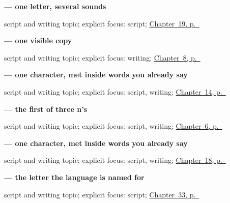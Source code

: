 \noindent\begin{minipage}[t]{\linewidth}
\raggedright
\textbf{ — one letter, several sounds}\par
\footnotesize script and writing topic; explicit focus: script; \hyperref[ch:ta-asking-age]{Chapter~19, p.~\pageref*{ch:ta-asking-age}}
\end{minipage}\par\smallskip

\noindent\begin{minipage}[t]{\linewidth}
\raggedright
\textbf{ — one visible copy}\par
\footnotesize script and writing topic; explicit focus: writing; \hyperref[ch:ta-please]{Chapter~8, p.~\pageref*{ch:ta-please}}
\end{minipage}\par\smallskip

\noindent\begin{minipage}[t]{\linewidth}
\raggedright
\textbf{ — one character, met inside words you already say}\par
\footnotesize script and writing topic; explicit focus: script, writing; \hyperref[ch:ta-seasons]{Chapter~14, p.~\pageref*{ch:ta-seasons}}
\end{minipage}\par\smallskip

\noindent\begin{minipage}[t]{\linewidth}
\raggedright
\textbf{ — the first of three n's}\par
\footnotesize script and writing topic; explicit focus: script, writing; \hyperref[ch:ta-dative-case]{Chapter~6, p.~\pageref*{ch:ta-dative-case}}
\end{minipage}\par\smallskip

\noindent\begin{minipage}[t]{\linewidth}
\raggedright
\textbf{ — one character, met inside words you already say}\par
\footnotesize script and writing topic; explicit focus: script, writing; \hyperref[ch:ta-telling-time]{Chapter~18, p.~\pageref*{ch:ta-telling-time}}
\end{minipage}\par\smallskip

\noindent\begin{minipage}[t]{\linewidth}
\raggedright
\textbf{ — the letter the language is named for}\par
\footnotesize script and writing topic; explicit focus: script; \hyperref[ch:ta-verbs-of-the-mind]{Chapter~33, p.~\pageref*{ch:ta-verbs-of-the-mind}}
\end{minipage}\par\smallskip

